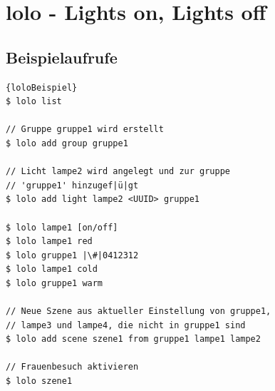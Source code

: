 \documentclass[a4paper,12pt]{article}
\begin{document}
\section{lolo - Lights on, Lights off}
\label{lolo}

\subsection{Beispielaufrufe}

\begin{lstlisting}[caption=lolo Beispielaufrufe]{loloBeispiel}
$ lolo list

// Gruppe gruppe1 wird erstellt
$ lolo add group gruppe1

// Licht lampe2 wird angelegt und zur gruppe
// 'gruppe1' hinzugef|ü|gt
$ lolo add light lampe2 <UUID> gruppe1

$ lolo lampe1 [on/off]
$ lolo lampe1 red
$ lolo gruppe1 |\#|0412312
$ lolo lampe1 cold
$ lolo gruppe1 warm

// Neue Szene aus aktueller Einstellung von gruppe1,
// lampe3 und lampe4, die nicht in gruppe1 sind
$ lolo add scene szene1 from gruppe1 lampe1 lampe2

// Frauenbesuch aktivieren
$ lolo szene1
\end{lstlisting}

\newpage

\printglossary[type=\acronymtype,title=Abkürzungsverzeichnis]

\newpage

\printglossary
\end{document}
